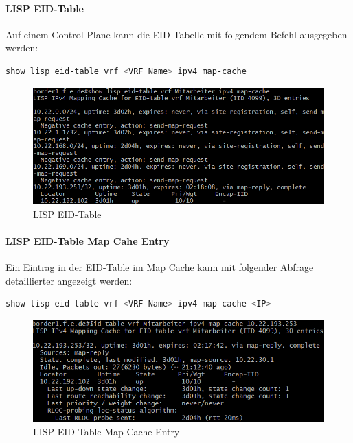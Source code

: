 \paragraph{LISP EID-Table}
Auf einem Control Plane kann die EID-Tabelle mit folgendem Befehl ausgegeben werden:

\begin{lstlisting}[language=bash]
show lisp eid-table vrf <VRF Name> ipv4 map-cache
\end{lstlisting}


\begin{figure}[H]
	\centering
	\includegraphics[width=0.8\linewidth]{img/Absicherung/lisp_eid-table}
	\caption{LISP EID-Table}
	\label{fig:LISP EID-Table}
\end{figure}




\paragraph{LISP EID-Table Map Cahe Entry}
Ein Eintrag in der EID-Table im Map Cache kann mit folgender Abfrage detaillierter angezeigt werden:

\begin{lstlisting}[language=bash]
show lisp eid-table vrf <VRF Name> ipv4 map-cache <IP>
\end{lstlisting}


\begin{figure}[H]
	\centering
	\includegraphics[width=0.8\linewidth]{img/Absicherung/lisp_eid-table-entry}
	\caption{LISP EID-Table Map Cache Entry}
	\label{fig:LISP EID-Table Map Cache Entry}
\end{figure}


